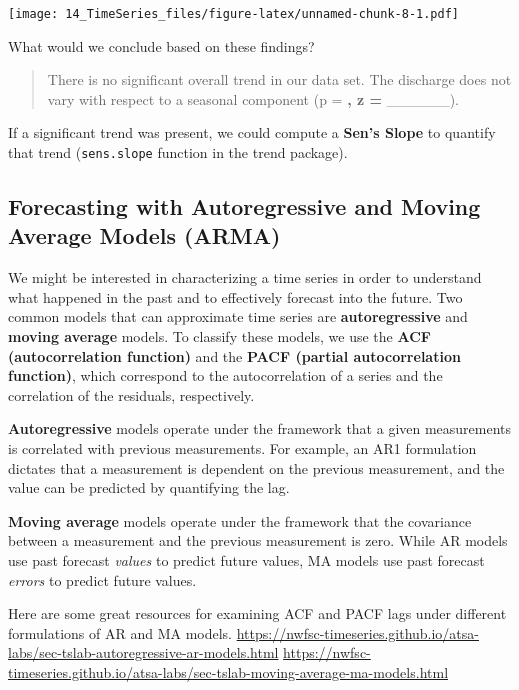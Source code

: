 \documentclass[
]{article}
\begin{document}
\texttt{[image: 14\_TimeSeries\_files/figure-latex/unnamed-chunk-8-1.pdf]}

What would we conclude based on these findings?

\begin{quote}
There is no significant overall trend in our data set. The discharge
does not vary with respect to a seasonal component (p = \textbf{, z =
}\_\_\_\_\_\_).
\end{quote}

If a significant trend was present, we could compute a \textbf{Sen's
Slope} to quantify that trend (\texttt{sens.slope} function in the trend
package).

\hypertarget{forecasting-with-autoregressive-and-moving-average-models-arma}{%
\subsection{Forecasting with Autoregressive and Moving Average Models
(ARMA)}\label{forecasting-with-autoregressive-and-moving-average-models-arma}}

We might be interested in characterizing a time series in order to
understand what happened in the past and to effectively forecast into
the future. Two common models that can approximate time series are
\textbf{autoregressive} and \textbf{moving average} models. To classify
these models, we use the \textbf{ACF (autocorrelation function)} and the
\textbf{PACF (partial autocorrelation function)}, which correspond to
the autocorrelation of a series and the correlation of the residuals,
respectively.

\textbf{Autoregressive} models operate under the framework that a given
measurements is correlated with previous measurements. For example, an
AR1 formulation dictates that a measurement is dependent on the previous
measurement, and the value can be predicted by quantifying the lag.

\textbf{Moving average} models operate under the framework that the
covariance between a measurement and the previous measurement is zero.
While AR models use past forecast \emph{values} to predict future
values, MA models use past forecast \emph{errors} to predict future
values.

Here are some great resources for examining ACF and PACF lags under
different formulations of AR and MA models.
\url{https://nwfsc-timeseries.github.io/atsa-labs/sec-tslab-autoregressive-ar-models.html}
\url{https://nwfsc-timeseries.github.io/atsa-labs/sec-tslab-moving-average-ma-models.html}
\end{document}
